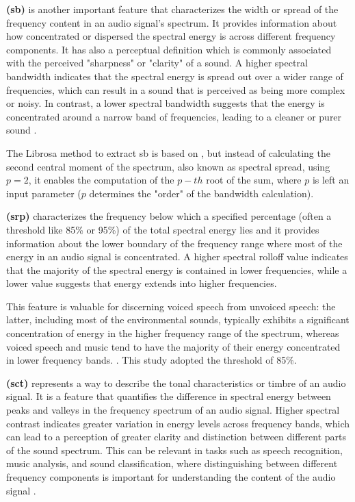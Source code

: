 \textbf{ (\gls{sb})} is another important feature that characterizes the width or spread of the frequency content in an audio signal's spectrum. It provides information about how concentrated or dispersed the spectral energy is across different frequency components. It has also a perceptual definition which is commonly associated with the perceived "sharpness" or "clarity" of a sound. A higher spectral bandwidth indicates that the spectral energy is spread out over a wider range of frequencies, which can result in a sound that is perceived as being more complex or noisy. In contrast, a lower spectral bandwidth suggests that the energy is concentrated around a narrow band of frequencies, leading to a cleaner or purer sound \cite{Park2008}.

The Librosa \cite{McFee2015librosa_sw} method to extract \gls{sb} is based on \textcite{Klapuri2006}, but instead of calculating the second central moment of the spectrum, also known as spectral spread, using $p=2$, it enables the computation of the $p-th$ root of the sum, where $p$ is left an input parameter ($p$ determines the "order" of the bandwidth calculation). 

\textbf{ (\gls{srp})} characterizes the frequency below which a specified percentage (often a threshold like 85\% or 95\%) of the total spectral energy lies and it provides information about the lower boundary of the frequency range where most of the energy in an audio signal is concentrated. A higher spectral rolloff value indicates that the majority of the spectral energy is contained in lower frequencies, while a lower value suggests that energy extends into higher frequencies.

This feature is valuable for discerning voiced speech from unvoiced speech: the latter, including most of the environmental sounds, typically exhibits a significant concentration of energy in the higher frequency range of the spectrum, whereas voiced speech and music tend to have the majority of their energy concentrated in lower frequency bands. \cite{Giannakopoulos2014}. This study adopted the threshold of 85\%.

\textbf{ (\gls{sct})} represents a way to describe the tonal characteristics or timbre of an audio signal. It is a feature that quantifies the difference in spectral energy between peaks and valleys in the frequency spectrum of an audio signal. Higher spectral contrast indicates greater variation in energy levels across frequency bands, which can lead to a perception of greater clarity and distinction between different parts of the sound spectrum. This can be relevant in tasks such as speech recognition, music analysis, and sound classification, where distinguishing between different frequency components is important for understanding the content of the audio signal \cite{Jiang2002}.

